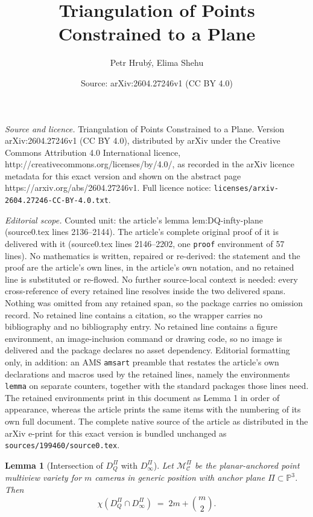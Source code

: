 \documentclass[10pt,a4paper]{amsart}
\title{Triangulation of Points Constrained to a Plane}
\author{Petr Hrub\'y, Elima Shehu}
\date{Source: arXiv:2604.27246v1 (CC BY 4.0)}
\newtheorem{lemma}{Lemma}
\newcommand{\PP}{\mathbb{P}}
\begin{document}
\maketitle

\noindent\emph{Source and licence.} Triangulation of Points Constrained to a Plane. Version arXiv:2604.27246v1 (CC BY 4.0), distributed by arXiv under the Creative Commons Attribution 4.0 International licence, http://creativecommons.org/licenses/by/4.0/, as recorded in the arXiv licence metadata for this exact version and shown on the abstract page https://arxiv.org/abs/2604.27246v1. Full licence notice: \texttt{licenses/arxiv-2604.27246-CC-BY-4.0.txt}.\par\smallskip

\noindent\textit{Editorial scope.} Counted unit: the article's lemma lem:DQ-infty-plane (source0.tex lines 2136--2144). The article's complete original proof of it is delivered with it (source0.tex lines 2146--2202, one \texttt{proof} environment of 57 lines). No mathematics is written, repaired or re-derived: the statement and the proof are the article's own lines, in the article's own notation, and no retained line is substituted or re-flowed.  No further source-local context is needed: every cross-reference of every retained line resolves inside the two delivered spans.  Nothing was omitted from any retained span, so the package carries no omission record.  No retained line contains a citation, so the wrapper carries no bibliography and no bibliography entry.  No retained line contains a figure environment, an image-inclusion command or drawing code, so no image is delivered and the package declares no asset dependency.  Editorial formatting only, in addition: an AMS \texttt{amsart} preamble that restates the article's own declarations and macros used by the retained lines, namely the environments \texttt{lemma} on separate counters, together with the standard packages those lines need.  The retained environments print in this document as Lemma 1 in order of appearance, whereas the article prints the same items with the numbering of its own full document.  The complete native source of the article as distributed in the arXiv e-print for this exact version is bundled unchanged as \texttt{sources/199460/source0.tex}.
\begin{lemma}[Intersection of $D_{Q}^{\Pi}$ with $D_{\infty}^{\Pi}$]
\label{lem:DQ-infty-plane}
Let $\mathcal{M}^\Pi_{\mathcal{C}}$ be the planar-anchored point multiview variety 
for $m$ cameras in generic position with anchor plane $\Pi \subset \PP^3$.
Then
\[
\chi\!\left(D_{Q}^{\Pi}\cap D_{\infty}^{\Pi}\right) \;=\; 2m + \binom{m}{2}.
\]
\end{lemma}
\end{document}
